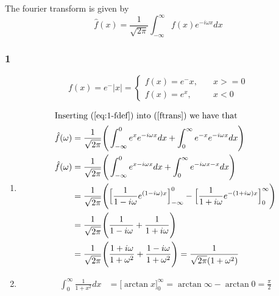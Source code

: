 \documentclass[a4paper]{article}
\newcommand{\ex}[1]{\subsubsection*{#1}}
\begin{document}
\pagestyle{fancy} %



The fourier transform is given by
\[\hat f(x) = \frac{1}{\sqrt{2\pi}}\int_{-\infty}^{\infty}{f(x)e^{-i\omega x} dx}
    \label{ftrans}\]


\ex{1}
\[ f(x) = e^-|x| = 
    \begin{cases}
        f(x) = e^-x, &\quad x >= 0 \\
        f(x) = e^x, &\quad x < 0 
    \end{cases} \label{eq:1-fdef} \]

\begin{enumerate}[label=\alph*)]
    \item { 
        \begin{align}
            \intertext{Inserting (\ref{eq:1-fdef}) into (\ref{ftrans}) we have that}
            \hat f(\omega ) &= \frac{1}{\sqrt{2\pi}}\Bigg(\int_{-\infty}^0{e^x
                e^{-i\omega x} dx} + \int_0^{\infty}{e^{-x} e^{-i\omega x} dx}\Bigg) \\
            \hat f(\omega ) &= \frac{1}{\sqrt{2\pi}}\Bigg(\int_{-\infty}^0{e^{x-i\omega x}dx} 
                + \int_0^{\infty}{e^{-i\omega x-x} dx}\Bigg) \\
            &= \frac{1}{\sqrt{2\pi}}\Bigg(\Big[{\frac{1}{1-i\omega }e^{(1-i\omega )x}\Big]_
                {-\infty}^{0}} - \Big[{\frac{1}{1+i\omega }
                e^{-(1+i\omega )x}\Big]_{0}^{\infty}}\Bigg) \\
            &= \frac{1}{\sqrt{2\pi}}\Bigg(\frac{1}{1-i\omega } + \frac{1}{1+i\omega }\Bigg) \\
            &= \frac{1}{\sqrt{2\pi}}\Bigg(\frac{1+i\omega }{1+\omega ^2} +
                \frac{1-i\omega }{1+\omega ^2}\Bigg) = \frac{1}{\sqrt{2\pi}(1 + \omega ^2)}\\
        \end{align}
    }

    \item{  %
        \begin{align}
            \int_0^\infty{\frac{1}{1+x^2} dx} &= \Big[\arctan x\Big]_0^\infty =
                \arctan \infty - \arctan 0 = \frac{\pi}{2}
        \end{align}
    }
\end{enumerate}
\end{document}
